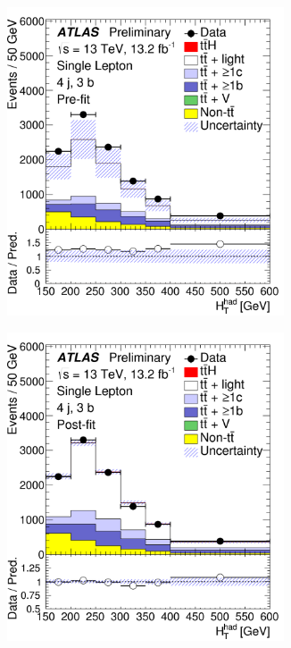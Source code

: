 \begin{figure}[htbp!]
\begin{subfigure}{0.24\textwidth}
  \caption{}
  \label{}
\end{subfigure}
\begin{subfigure}{0.24\textwidth}
  \centering
  \includegraphics[width=0.9\textwidth]{figures/ttH/fig_07c.png}
  \caption{}
  \label{}
\end{subfigure}
\begin{subfigure}{0.24\textwidth}
  \centering
  \includegraphics[width=0.9\textwidth]{figures/ttH/fig_07d.png}

\end{subfigure}
\end{figure}
